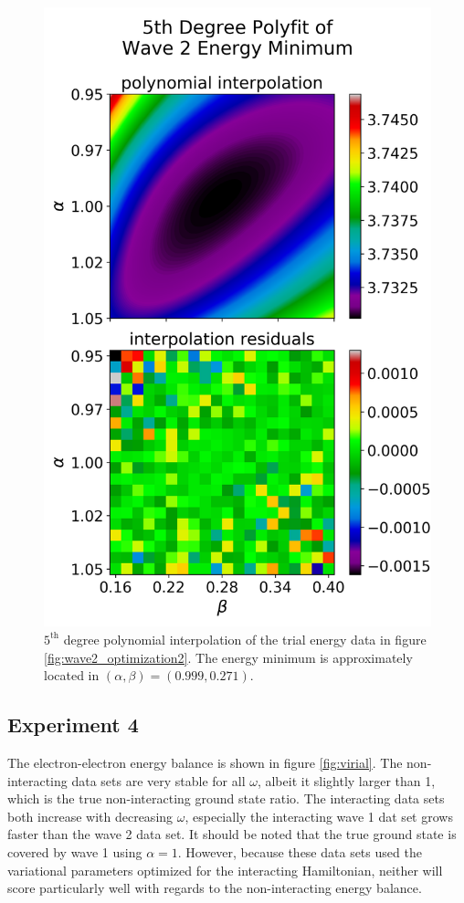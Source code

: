 \documentclass[nofootinbib,reprint,english]{revtex4-1}
\begin{document}
\begin{figure}[h!]
\centering
\includegraphics[scale=0.55]{../results/wave2/energy_minimization_deg5polyfit_4.png}
\caption{\(5^\text{th}\) degree polynomial interpolation of the trial energy data in figure \ref{fig:wave2_optimization2}. The energy minimum is approximately located in \((\alpha,\beta)=(0.999,0.271)\).}\label{fig:wave2_polyfit}
\end{figure}


\clearpage
\subsection{Experiment 4}
The electron-electron energy balance is shown in figure \ref{fig:virial}. The non-interacting data sets are very stable for all \(\omega\), albeit it slightly larger than 1, which is the true non-interacting ground state ratio. The interacting data sets both increase with decreasing \(\omega\), especially the interacting wave 1 dat set grows faster than the wave 2 data set. It should be noted that the true ground state is covered by wave 1 using \(\alpha=1\). However, because these data sets used the variational parameters optimized for the interacting Hamiltonian, neither will score particularly well with regards to the non-interacting energy balance.
\end{document}
